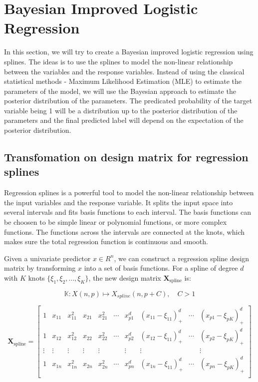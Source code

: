 \section{Bayesian Improved Logistic Regression}

In this section, we will try to create a Bayesian improved logistic regression using splines.
The ideas is to use the splines to model the non-linear relationship between the variables and the response variables.
Instead of using the classical statistical methods - Maximum Likelihood Estimation (MLE) to 
estimate the parameters of the model, we will use the Bayesian approach to estimate the posterior distribution of the parameters.
The predicated probability of the target variable being 1 will be a distribution 
up to the posterior distribution of the parameters and the final predicted label will depend on the expectation of 
the posterior distribution.


\subsection{Transfomation on design matrix for regression splines}

Regression splines is a powerful tool to model the non-linear relationship 
between the input variables and the response variable. It splits the input space into 
several intervals and fits basis functions to each interval. The basis functions can 
be choosen to be simple linear or polynomial functions, or more complex functions. 
The functions across the intervals are connected at the knots, which makes sure 
the total regression function is continuous and smooth.

Given a univariate predictor $x \in {R}^n$, we can construct a regression spline design matrix by transforming $x$ into a set of basis functions. For a spline of degree $d$ with $K$ knots $\{\xi_1, \xi_2, \dots, \xi_K\}$, the new design matrix $\mathbf{X}_{\text{spline}}$ is:

\[
\mathbb {K}:  X (n,p) \mapsto X_{spline}(n, p + C), \quad C > 1
\]

\[
\mathbf{X}_{\text{spline}} = 
\begin{bmatrix}
1 & x_{11} & x_{11}^2  & x_{21} & x_{21}^2  & \cdots & x_{p1}^d & (x_{11} - \xi_{11})_+^d & \cdots & (x_{p1} - \xi_{pK})_+^d \\
1 & x_{12} & x_{12}^2  & x_{22} & x_{22}^2 & \cdots & x_{p2}^d & (x_{12} - \xi_{11})_+^d & \cdots & (x_{p2} - \xi_{pK})_+^d \\
\vdots & \vdots  & \vdots & \vdots & \vdots & & \vdots & \vdots & & \vdots \\
1 & x_{1n} & x_{1n}^2  & x_{2n} & x_{2n}^2 & \cdots & x_{pn}^d & (x_{1n} - \xi_{11})_+^d & \cdots & (x_{pn} - \xi_{pK})_+^d \\
\end{bmatrix}
\]

